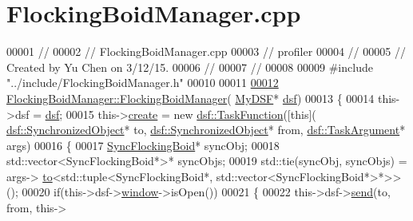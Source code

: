 \hypertarget{_flocking_boid_manager_8cpp_source}{}\section{Flocking\+Boid\+Manager.\+cpp}
\label{_flocking_boid_manager_8cpp_source}

\begin{DoxyCode}
00001 \textcolor{comment}{//}
00002 \textcolor{comment}{//  FlockingBoidManager.cpp}
00003 \textcolor{comment}{//  profiler}
00004 \textcolor{comment}{//}
00005 \textcolor{comment}{//  Created by Yu Chen on 3/12/15.}
00006 \textcolor{comment}{//}
00007 \textcolor{comment}{//}
00008 
00009 \textcolor{preprocessor}{#include "../include/FlockingBoidManager.h"}
00010 
00011 
\hypertarget{_flocking_boid_manager_8cpp_source_l00012}{}\hyperlink{class_flocking_boid_manager_a54782df4dd7271ffae97e3cf0fd5e8a1}{00012} \hyperlink{class_flocking_boid_manager_a54782df4dd7271ffae97e3cf0fd5e8a1}{FlockingBoidManager::FlockingBoidManager}(
      \hyperlink{class_my_d_s_f}{MyDSF}* \hyperlink{namespacedsf}{dsf})
00013 \{
00014     this->dsf = \hyperlink{class_flocking_boid_manager_a9a564c99978c8e6115562472544bb839}{dsf};
00015     this->\hyperlink{class_flocking_boid_manager_adba8774f051608d3aa3591cd848087bb}{create} = \textcolor{keyword}{new} \hyperlink{namespacedsf_aa16e735f29587f4485b56fc46746f7a9}{dsf::TaskFunction}([\textcolor{keyword}{this}](
      \hyperlink{classdsf_1_1_synchronized_object}{dsf::SynchronizedObject}* to, \hyperlink{classdsf_1_1_synchronized_object}{dsf::SynchronizedObject}* from, 
      \hyperlink{classyc_1_1_any}{dsf::TaskArgument}* args)
00016                                          \{
00017                                              \hyperlink{class_sync_flocking_boid}{SyncFlockingBoid}* syncObj;
00018                                              std::vector<SyncFlockingBoid*>* syncObjs;
00019                                              std::tie(syncObj, syncObjs) = args->
      \hyperlink{classyc_1_1_any_a3db663604505ef8d7e84dd41d5bfcc75}{to}<std::tuple<SyncFlockingBoid*, std::vector<SyncFlockingBoid*>*>>();
00020                                              \textcolor{keywordflow}{if}(this->dsf->\hyperlink{classdsf_1_1sfml_1_1_render_window_a2c04b61ca1bfba140120001c4a9a30e1}{window}->isOpen())
00021                                              \{
00022                                                  this->dsf->\hyperlink{classdsf_1_1_dual_state_framework_a3063d7f0ce537eb44dc2bdcec816a36b}{send}(to, from, this->

\end{DoxyCode}
